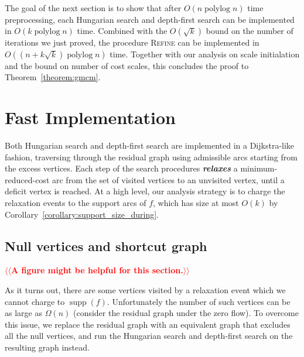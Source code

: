 \documentclass[a4paper,UKenglish]{socg-lipics-v2018}
\makeatletter
\def\note#1{\textcolor{red}{{#1}}}
\def\polylog{\mathop{\mathrm{polylog}}}
\def\supp{\operatorname{supp}}
\theoremstyle{plain}
\numberwithin{figure}{section}
\def\EMPH#1{\textbf{\emph{\boldmath #1}}}
\def\n@te#1{\textsf{\boldmath \textbf{$\langle\!\langle$#1$\rangle\!\rangle$}}\leavevmode}
\def\note#1{\textcolor{red}{\n@te{#1}}}
\makeatother
\begin{document}

The goal of the next section is to show that after $O(n \polylog n)$ time preprocessing, each Hungarian search and depth-first search can be implemented in $O(k \polylog n)$ time.
%
Combined with the $O(\sqrt{k})$ bound on the number of iterations we just proved, the procedure \textsc{Refine} can be implemented in $O((n+k\sqrt{k}) \polylog n)$ time.  Together with our analysis on scale initialation and the bound on number of cost scales, this concludes the proof to Theorem~\ref{theorem:gmcm}.


\section{Fast Implementation}
\label{S:implementation}

Both Hungarian search and depth-first search are implemented in a Dijkstra-like fashion, traversing through the residual graph using admissible arcs starting from the excess vertices.
Each step of the search procedures \EMPH{relaxes} a minimum-reduced-cost arc from the set of visited vertices to an unvisited vertex, until a deficit vertex is reached.
%
At a high level, our analysis strategy is to charge the relaxation events to the support arcs of $f$, which has size at most $O(k)$ by Corollary~\ref{corollary:support_size_during}.

\subsection{Null vertices and shortcut graph}

\note{A figure might be helpful for this section.}

As it turns out, there are some vertices visited by a relaxation event which we cannot charge to $\supp(f)$.
Unfortunately the number of such vertices can be as large as $\Omega(n)$
(consider the residual graph under the zero flow).
%
To overcome this issue, we replace the residual graph with an equivalent graph that excludes all the null vertices,
and run the Hungarian search and depth-first search on the resulting graph instead.
\end{document}
